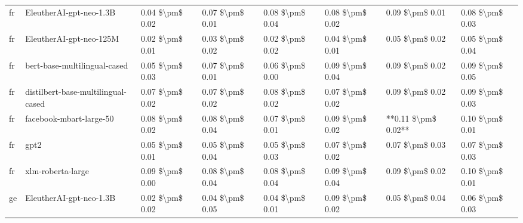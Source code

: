 \begin{tabular}{llllllll}
      fr &            EleutherAI-gpt-neo-1.3B & 0.04 \$\textbackslash pm\$ 0.02 &           0.07 \$\textbackslash pm\$ 0.01 &       0.08 \$\textbackslash pm\$ 0.04 &        0.08 \$\textbackslash pm\$ 0.02 &                         0.09 \$\textbackslash pm\$ 0.01 &     0.08 \$\textbackslash pm\$ 0.03 \\
      fr &            EleutherAI-gpt-neo-125M & 0.02 \$\textbackslash pm\$ 0.01 &           0.03 \$\textbackslash pm\$ 0.02 &       0.02 \$\textbackslash pm\$ 0.02 &        0.04 \$\textbackslash pm\$ 0.01 &                         0.05 \$\textbackslash pm\$ 0.02 &     0.05 \$\textbackslash pm\$ 0.04 \\
      fr &       bert-base-multilingual-cased & 0.05 \$\textbackslash pm\$ 0.03 &           0.07 \$\textbackslash pm\$ 0.01 &       0.06 \$\textbackslash pm\$ 0.00 &        0.09 \$\textbackslash pm\$ 0.04 &                         0.09 \$\textbackslash pm\$ 0.02 &     0.09 \$\textbackslash pm\$ 0.05 \\
      fr & distilbert-base-multilingual-cased & 0.07 \$\textbackslash pm\$ 0.02 &           0.07 \$\textbackslash pm\$ 0.02 &       0.08 \$\textbackslash pm\$ 0.02 &        0.07 \$\textbackslash pm\$ 0.02 &                         0.09 \$\textbackslash pm\$ 0.02 &     0.09 \$\textbackslash pm\$ 0.03 \\
      fr &            facebook-mbart-large-50 & 0.08 \$\textbackslash pm\$ 0.02 &           0.08 \$\textbackslash pm\$ 0.04 &       0.07 \$\textbackslash pm\$ 0.01 &        0.09 \$\textbackslash pm\$ 0.02 &                     **0.11 \$\textbackslash pm\$ 0.02** &     0.10 \$\textbackslash pm\$ 0.01 \\
      fr &                               gpt2 & 0.05 \$\textbackslash pm\$ 0.01 &           0.05 \$\textbackslash pm\$ 0.04 &       0.05 \$\textbackslash pm\$ 0.03 &        0.07 \$\textbackslash pm\$ 0.02 &                         0.07 \$\textbackslash pm\$ 0.03 &     0.07 \$\textbackslash pm\$ 0.03 \\
      fr &                  xlm-roberta-large & 0.09 \$\textbackslash pm\$ 0.00 &           0.08 \$\textbackslash pm\$ 0.04 &       0.08 \$\textbackslash pm\$ 0.04 &        0.09 \$\textbackslash pm\$ 0.04 &                         0.09 \$\textbackslash pm\$ 0.02 &     0.10 \$\textbackslash pm\$ 0.01 \\
      ge &            EleutherAI-gpt-neo-1.3B & 0.02 \$\textbackslash pm\$ 0.02 &           0.04 \$\textbackslash pm\$ 0.05 &       0.04 \$\textbackslash pm\$ 0.01 &        0.09 \$\textbackslash pm\$ 0.02 &                         0.05 \$\textbackslash pm\$ 0.04 &     0.06 \$\textbackslash pm\$ 0.03 \\

\end{tabular}
